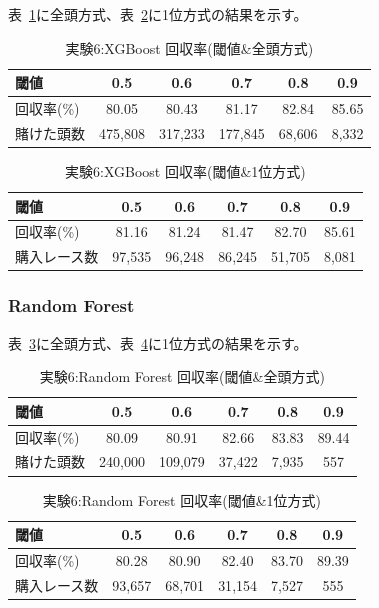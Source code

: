 \documentclass[dvipdfmx, a4paper, 11pt, titlepage]{jsarticle}
\begin{document}
表~\ref{tab:exp6_xgb_all}に全頭方式、表~\ref{tab:exp6_xgb_top1}に1位方式の結果を示す。

\begin{table}[H]
  \centering
  \caption{実験6:XGBoost 回収率(閾値\&全頭方式)}
  \label{tab:exp6_xgb_all}
  \begin{tabular}{lccccc}
    \toprule
    閾値 & 0.5 & 0.6 & 0.7 & 0.8 & 0.9 \\
    \midrule
    回収率(\%)   & 80.05 & 80.43 & 81.17 & 82.84 & 85.65 \\
    賭けた頭数   & 475{,}808 & 317{,}233 & 177{,}845 & 68{,}606 & 8{,}332 \\
    \bottomrule
  \end{tabular}
\end{table}

\begin{table}[H]
  \centering
  \caption{実験6:XGBoost 回収率(閾値\&1位方式)}
  \label{tab:exp6_xgb_top1}
  \begin{tabular}{lccccc}
    \toprule
    閾値 & 0.5 & 0.6 & 0.7 & 0.8 & 0.9 \\
    \midrule
    回収率(\%)     & 81.16 & 81.24 & 81.47 & 82.70 & 85.61 \\
    購入レース数   & 97{,}535 & 96{,}248 & 86{,}245 & 51{,}705 & 8{,}081 \\
    \bottomrule
  \end{tabular}
\end{table}

\subsubsection*{Random Forest}

表~\ref{tab:exp6_rf_all}に全頭方式、表~\ref{tab:exp6_rf_top1}に1位方式の結果を示す。

\begin{table}[H]
  \centering
  \caption{実験6:Random Forest 回収率(閾値\&全頭方式)}
  \label{tab:exp6_rf_all}
  \begin{tabular}{lccccc}
    \toprule
    閾値 & 0.5 & 0.6 & 0.7 & 0.8 & 0.9 \\
    \midrule
    回収率(\%)   & 80.09 & 80.91 & 82.66 & 83.83 & 89.44 \\
    賭けた頭数   & 240{,}000 & 109{,}079 & 37{,}422 & 7{,}935 & 557 \\
    \bottomrule
  \end{tabular}
\end{table}

\begin{table}[H]
  \centering
  \caption{実験6:Random Forest 回収率(閾値\&1位方式)}
  \label{tab:exp6_rf_top1}
  \begin{tabular}{lccccc}
    \toprule
    閾値 & 0.5 & 0.6 & 0.7 & 0.8 & 0.9 \\
    \midrule
    回収率(\%)     & 80.28 & 80.90 & 82.40 & 83.70 & 89.39 \\
    購入レース数   & 93{,}657 & 68{,}701 & 31{,}154 & 7{,}527 & 555 \\
    \bottomrule
  \end{tabular}
\end{table}
\end{document}
